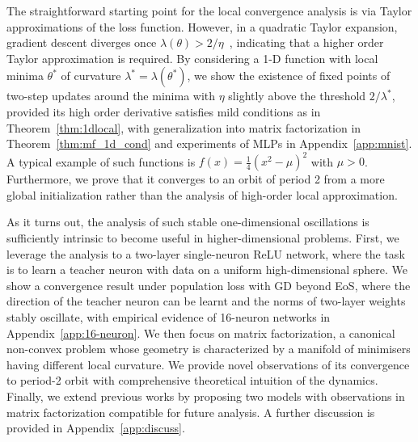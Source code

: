\documentclass{article}
\newcommand{\citep}[1]{\cite{#1}}
\theoremstyle{plain}
\theoremstyle{remark}
\begin{document}

The straightforward starting point for the local convergence analysis is via Taylor  approximations of the loss function. However, in a quadratic Taylor expansion, gradient descent diverges once $\lambda(\theta) > 2/\eta$~\citep{cohen2020gradient}, indicating that a higher order Taylor approximation is required. By considering a 1-D function with local minima $\theta^*$ of curvature $\lambda^* = \lambda(\theta^*)$, we show the existence of fixed points of two-step updates around the minima with $\eta$ slightly above the threshold $2/\lambda^*$, provided its high order derivative satisfies mild conditions as in Theorem~\ref{thm:1dlocal}, with generalization into matrix factorization in Theorem~\ref{thm:mf_1d_cond} and experiments of MLPs in Appendix~\ref{app:mnist}. A typical example of such functions is $f(x)=\frac{1}{4}(x^2-\mu)^2$ with $\mu>0$. Furthermore, we prove that it converges to an orbit of period 2 from a more global initialization rather than the analysis of high-order local approximation.

As it turns out, the analysis of such stable one-dimensional oscillations is sufficiently intrinsic to become useful in higher-dimensional problems. First,  
we leverage the analysis to a two-layer single-neuron ReLU network, where the task is to learn a teacher neuron with data on a uniform high-dimensional sphere. We show a convergence result under population loss with GD beyond EoS, where the direction of the teacher neuron can be learnt and the norms of two-layer weights stably oscillate, with empirical evidence of 16-neuron networks in Appendix~\ref{app:16-neuron}. We then focus on matrix factorization, a canonical non-convex problem whose geometry is characterized by a manifold of minimisers having different local curvature. 
We provide novel observations of its convergence to period-2 orbit with comprehensive theoretical intuition of the dynamics.
Finally, we extend previous works by proposing two models with observations in matrix factorization compatible for future analysis.
A further discussion is provided in Appendix~\ref{app:discuss}.
\end{document}
